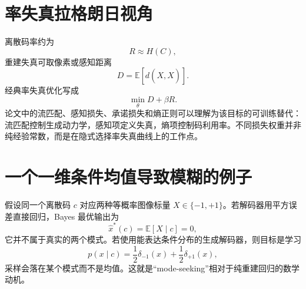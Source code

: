 \documentclass[UTF8,12pt,a4paper,fontset=none]{ctexart}
\numberwithin{equation}{section}
\newcommand{\E}{\mathbb{E}}
\begin{document}
\section{率失真拉格朗日视角}
离散码率约为
\begin{equation}
 R\approx H(C),
\end{equation}
重建失真可取像素或感知距离
\begin{equation}
 D=\E[d(X,\widehat X)].
\end{equation}
经典率失真优化写成
\begin{equation}
 \min_\theta D+\beta R.
\end{equation}
论文中的流匹配、感知损失、承诺损失和熵正则可以理解为该目标的可训练替代：流匹配控制生成动力学，感知项定义失真，熵项控制码利用率。不同损失权重并非纯经验常数，而是在隐式选择率失真曲线上的工作点。

\section{一个一维条件均值导致模糊的例子}
假设同一个离散码 $c$ 对应两种等概率图像标量 $X\in\{-1,+1\}$。若解码器用平方误差直接回归，Bayes 最优输出为
\begin{equation}
 \widehat x^*(c)=\E[X\mid c]=0,
\end{equation}
它并不属于真实的两个模式。若使用能表达条件分布的生成解码器，则目标是学习
\begin{equation}
 p(x\mid c)=\frac12\delta_{-1}(x)+\frac12\delta_{+1}(x),
\end{equation}
采样会落在某个模式而不是均值。这就是“mode-seeking”相对于纯重建回归的数学动机。
\end{document}
